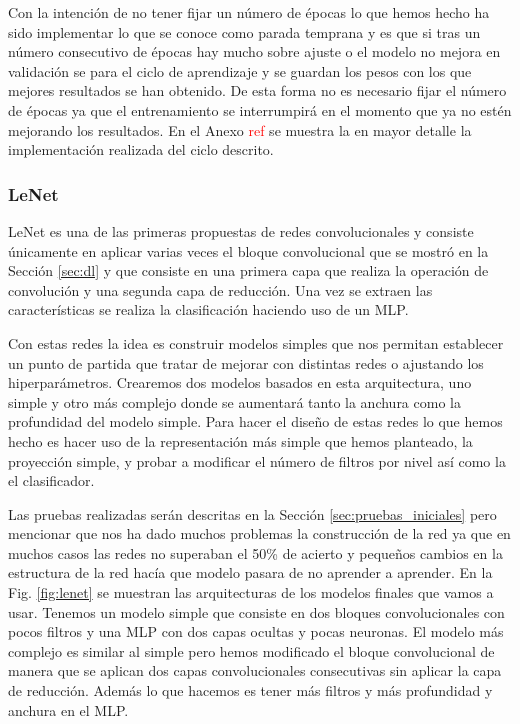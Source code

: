 \documentclass[a4paper,12pt,twoside,titlepage]{article}
\newcommand{\red}[1]{\textcolor{red}{#1}}
\begin{document}
Con la intención de no tener fijar un número de épocas lo que hemos hecho ha sido implementar lo que se conoce como parada temprana y es que si tras un número consecutivo de épocas hay mucho sobre ajuste o el modelo no mejora en validación se para el ciclo de aprendizaje y se guardan los pesos con los que mejores resultados se han obtenido. De esta forma no es necesario fijar el número de épocas ya que el entrenamiento se interrumpirá en el momento que ya no estén mejorando los resultados. En el Anexo \red{ref} se muestra la en mayor detalle la implementación realizada del ciclo descrito.

\subsubsection*{LeNet}

LeNet es una de las primeras propuestas de redes convolucionales \cite{lenet} y consiste únicamente en aplicar varias veces el bloque convolucional que se mostró en la Sección \ref{sec:dl} y que consiste en una primera capa que realiza la operación de convolución y una segunda capa de reducción. Una vez se extraen las características se realiza la clasificación haciendo uso de un MLP.

Con estas redes la idea es construir modelos simples que nos permitan establecer un punto de partida que tratar de mejorar con distintas redes o ajustando los hiperparámetros. Crearemos dos modelos basados en esta arquitectura, uno simple y otro más complejo donde se aumentará tanto la anchura como la profundidad del modelo simple. Para hacer el diseño de estas redes lo que hemos hecho es hacer uso de la representación más simple que hemos planteado, la proyección simple, y probar a modificar el número de filtros por nivel así como la el clasificador.

Las pruebas realizadas serán descritas en la Sección \ref{sec:pruebas_iniciales} pero mencionar que nos ha dado muchos problemas la construcción de la red ya que en muchos casos las redes no superaban el 50\% de acierto y pequeños cambios en la estructura de la red hacía que modelo pasara de no aprender a aprender. En la Fig. \ref{fig:lenet} se muestran las arquitecturas de los modelos finales que vamos a usar. Tenemos un modelo simple que consiste en dos bloques convolucionales con pocos filtros y una MLP con dos capas ocultas y pocas neuronas. El modelo más complejo es similar al simple pero hemos modificado el bloque convolucional de manera que se aplican dos capas convolucionales consecutivas sin aplicar la capa de reducción. Además lo que hacemos es tener más filtros y más profundidad y anchura en el MLP.
\end{document}
